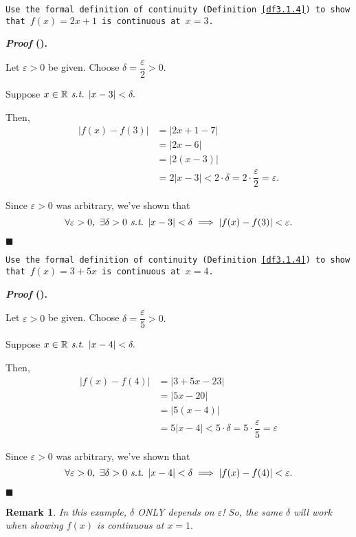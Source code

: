 \documentclass[12pt,a4paper]{article}
\newcounter{nprf}[subsection]
\newtheorem*{rmk}{\indent Remark}
\newenvironment*{prf}{\par\indent\textbf{\textit{Proof} (\stepcounter{nprf}\thenprf). }\par }{\par\hfill $\blacksquare$\par}
\def\R{{\mathbb{R}}}
\def\st{\emph{ s.t. }}
\begin{document}
\begin{framed}
\noindent\texttt{Use the formal definition of continuity (Definition \ref{df3.1.4}) to show that $f(x)=2x+1$ is continuous at $x=3$. }
\begin{prf}
	Let $\varepsilon>0$ be given. Choose $\delta=\dfrac{\varepsilon}{2}>0.$\par Suppose $x\in\R\st |x-3|<\delta.$\par Then, \[\begin{aligned}|f(x)-f(3)|&=|2x+1-7|\\&=|2x-6|\\&=|2(x-3)|\\&=2|x-3|<2\cdot\delta=2\cdot\dfrac{\varepsilon}{2}=\varepsilon.\end{aligned}\]\par Since $\varepsilon>0$ was arbitrary, we've shown that \[\forall\varepsilon>0,\ \exists\delta>0\st|x-3|<\delta\implies|f(x)-f(3)|<\varepsilon.\]
\end{prf}
\end{framed}
\begin{framed}
\noindent\texttt{Use the formal definition of continuity (Definition \ref{df3.1.4}) to show that $f(x)=3+5x$ is continuous at $x=4$. }
\begin{prf}
	Let $\varepsilon>0$ be given. Choose $\delta=\dfrac{\varepsilon}{5}>0.$\par Suppose $x\in\R\st|x-4|<\delta.$\par Then, \[\begin{aligned}|f(x)-f(4)|&=|3+5x-23|\\&=|5x-20|\\&=|5(x-4)|\\&=5|x-4|<5\cdot\delta=5\cdot\dfrac{\varepsilon}{5}=\varepsilon\end{aligned}\]\par Since $\varepsilon>0$ was arbitrary, we've shown that \[\forall\varepsilon>0,\ \exists\delta>0\st|x-4|<\delta\implies|f(x)-f(4)|<\varepsilon.\]
\end{prf}
\begin{rmk} In this example, $\delta$ ONLY depends on $\varepsilon$! So, the same $\delta$ will work when showing $f(x)$ is continuous at $x=1.$\end{rmk}
\end{framed}
\end{document}
